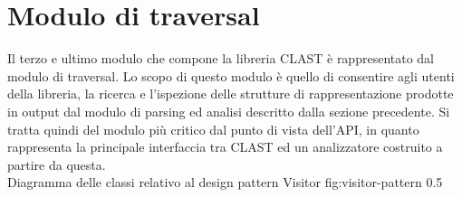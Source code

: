 \section{Modulo di traversal}

Il terzo e ultimo modulo che compone la libreria CLAST è rappresentato dal
modulo di traversal. Lo scopo di questo modulo è quello di consentire agli
utenti della libreria, la ricerca e l'ispezione delle strutture di
rappresentazione prodotte in output dal modulo di parsing ed analisi descritto
dalla sezione precedente. Si tratta quindi del modulo più critico dal punto di
vista dell'API, in quanto rappresenta la principale interfaccia tra CLAST ed
un analizzatore costruito a partire da questa.\\

      {Diagramma delle classi relativo al design pattern Visitor}
      {fig:visitor-pattern}
      {0.5}








